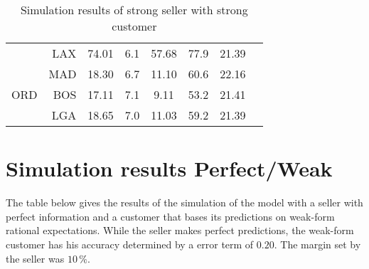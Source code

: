 \begin{table}[h]
\begin{center}
\begin{tabular}{l r c c c c c c}
     &  LAX &   74.01  &     6.1  &   57.68  &    77.9  &   21.39  \\
     &  MAD &   18.30  &     6.7  &   11.10  &    60.6  &   22.16  \\[.5ex]
ORD  &  BOS &   17.11  &     7.1  &    9.11  &    53.2  &   21.41  \\
     &  LGA &   18.65  &     7.0  &   11.03  &    59.2  &   21.39  \\
            \bottomrule
        \end{tabular}
        \caption{Simulation results of strong seller with strong customer}
        \label{tbl:resultsStrongStrong}
    \end{center}
\end{table}




\chapter{Simulation results Perfect/Weak}
\label{app:SimulationResultsPerfectWeak}
The table below gives the results of the simulation of the model with a seller with perfect information and a customer that bases its predictions on weak-form rational expectations. While the seller makes perfect predictions, the weak-form customer has his accuracy determined by a error term of $0.20$. The margin set by the seller was $10\,\%$.

